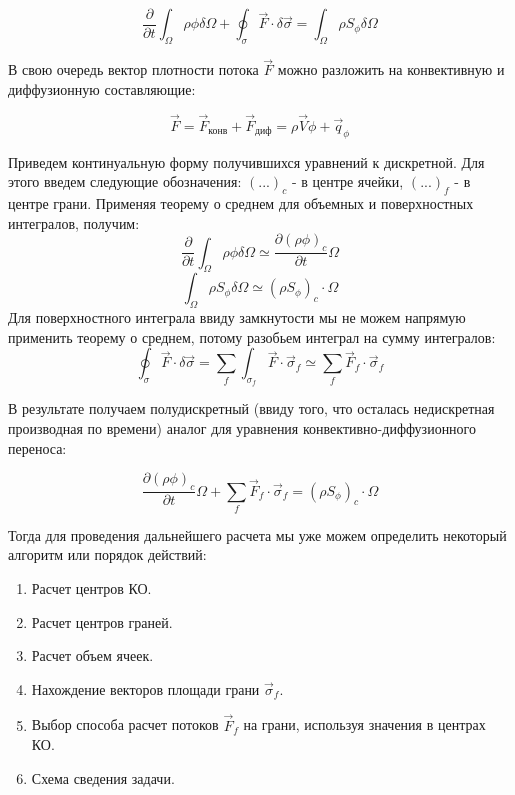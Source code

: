 \begin{equation}
    \frac{\partial}{\partial t}\int_{\Omega}\rho\phi\delta\Omega+\oint_\sigma\vec{F}\cdot\delta\vec{\sigma} = \int_\Omega\rho S_\phi\delta\Omega
    \label{eq:1}
\end{equation}

В свою очередь вектор плотности потока $\vec{F}$ можно разложить на конвективную и диффузионную составляющие:

\begin{equation}
    \vec{F} = \vec{F}_{\text{конв}}+\vec{F}_{\text{диф}} = \rho\vec{V}\phi+\vec{q}_\phi
    \label{eq:2}
\end{equation}

Приведем континуальную форму получившихся уравнений к дискретной. Для этого введем следующие обозначения: $(...)_{c}$ - в центре ячейки, $(...)_f$ - в центре грани. Применяя теорему о среднем для объемных и поверхностных интегралов, получим:
\begin{equation}
    \frac{\partial}{\partial t} \int_\Omega\rho\phi\delta\Omega \simeq \frac{\partial(\rho\phi)_c}{\partial t}\Omega
\end{equation}
\begin{equation}
    \int_\Omega \rho S_\phi\delta\Omega \simeq (\rho S_\phi)_c\cdot\Omega
\end{equation}
Для поверхностного интеграла ввиду замкнутости мы не можем напрямую применить теорему о среднем, потому разобьем интеграл на сумму интегралов:
\begin{equation}
    \oint_\sigma\vec{F}\cdot\delta\vec{\sigma} = \sum_f\int_{\sigma_f}\vec{F}\cdot \vec{\sigma}_f\simeq \sum_f \vec{F}_f\cdot \vec{\sigma}_f
\end{equation}

В результате получаем полудискретный (ввиду того, что осталась недискретная производная по времени) аналог для уравнения конвективно-диффузионного переноса:

\begin{equation}
    \frac{\partial(\rho\phi)_c}{\partial t}\Omega+\sum_f \vec{F}_f\cdot\vec{\sigma}_f=(\rho S_\phi)_c\cdot\Omega
\end{equation}


Тогда для проведения дальнейшего расчета мы уже можем определить некоторый алгоритм или порядок действий:
\begin{enumerate}
    \item Расчет центров КО.
    \item Расчет центров граней.
    \item Расчет объем ячеек.
    \item Нахождение векторов площади грани $\vec{\sigma}_f$.
    \item Выбор способа расчет потоков $\vec{F}_f$ на грани, используя значения в центрах КО.
    \item Схема сведения задачи.
\end{enumerate}



